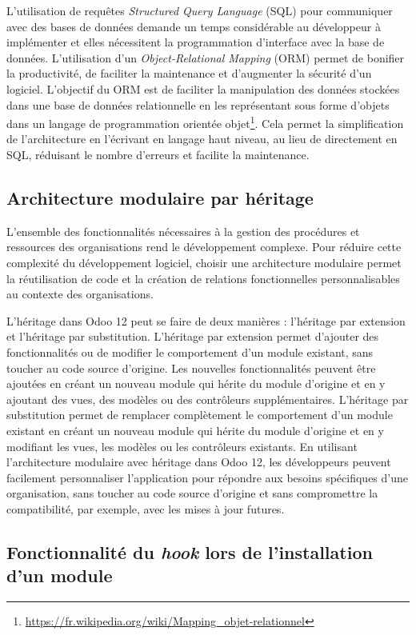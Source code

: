 L'utilisation de requêtes \textit{Structured Query Language} (SQL) pour communiquer avec des bases de données demande un temps considérable au développeur à implémenter et elles nécessitent la programmation d'interface avec la base de données. L'utilisation d'un \textit{Object-Relational Mapping} (ORM) permet de bonifier la productivité, de faciliter la maintenance et d'augmenter la sécurité d'un logiciel. L’objectif du ORM est de faciliter la manipulation des données stockées dans une base de données relationnelle en les représentant sous forme d’objets dans un langage de programmation orientée objet\footnote{\url{https://fr.wikipedia.org/wiki/Mapping_objet-relationnel}}. Cela permet la simplification de l’architecture en l’écrivant en langage haut niveau, au lieu de directement en SQL, réduisant le nombre d'erreurs et facilite la maintenance.

\subsection{Architecture modulaire par héritage}

L'ensemble des fonctionnalités nécessaires à la gestion des procédures et ressources des organisations rend le développement complexe. Pour réduire cette complexité du développement logiciel, choisir une architecture modulaire permet la réutilisation de code et la création de relations fonctionnelles personnalisables au contexte des organisations.

L’héritage dans Odoo 12 peut se faire de deux manières : l'héritage par extension et l'héritage par substitution. L’héritage par extension permet d’ajouter des fonctionnalités ou de modifier le comportement d’un module existant, sans toucher au code source d’origine. Les nouvelles fonctionnalités peuvent être ajoutées en créant un nouveau module qui hérite du module d’origine et en y ajoutant des vues, des modèles ou des contrôleurs supplémentaires. L’héritage par substitution permet de remplacer complètement le comportement d’un module existant en créant un nouveau module qui hérite du module d’origine et en y modifiant les vues, les modèles ou les contrôleurs existants. En utilisant l’architecture modulaire avec héritage dans Odoo 12, les développeurs peuvent facilement personnaliser l’application pour répondre aux besoins spécifiques d'une organisation, sans toucher au code source d’origine et sans compromettre la compatibilité, par exemple, avec les mises à jour futures.

\subsection{Fonctionnalité du \textit{hook} lors de l’installation d’un module}

